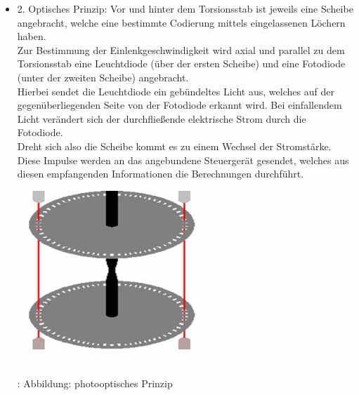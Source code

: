 \documentclass{article}
\begin{document}
\begin{itemize}
	
					\item 2. Optisches Prinzip:
							Vor und hinter dem Torsionsstab ist jeweils eine Scheibe angebracht, welche eine bestimmte Codierung mittels eingelassenen Löchern haben.\\
							Zur Bestimmung der Einlenkgeschwindigkeit wird axial und parallel zu dem Torsionsstab eine Leuchtdiode (über der ersten Scheibe) und eine Fotodiode (unter der zweiten Scheibe) angebracht. \\
							Hierbei sendet die Leuchtdiode ein gebündeltes Licht aus, welches auf der gegenüberliegenden Seite von der Fotodiode erkannt wird. Bei einfallendem Licht verändert sich der durchfließende elektrische Strom durch die Fotodiode.\\
							Dreht sich also die Scheibe kommt es zu einem Wechsel der Stromstärke. Diese Impulse werden an das angebundene Steuergerät gesendet, welches aus diesen empfangenden Informationen die Berechnungen durchführt.\\
							
							\begin{center}
								\includegraphics[width=7cm, height=6cm] {Images/Kapitel5/photoelektrisch.png}
 								\caption {\\\cite{TS14}: Abbildung: photooptisches Prinzip}
							\end{center}	

				\end{itemize}
\end{document}
